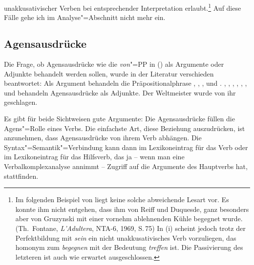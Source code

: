 unakkusativischer Verben bei entsprechender Interpretation erlaubt.\footnote{
        Im folgenden Beispiel von \citet[]{Faucher87}
        liegt keine solche abweichende Lesart vor.
        \ea
        Es konnte ihm nicht entgehen, dass ihm von Reiff und Duquesde,
        ganz besonders aber von Gruzynski mit einer vornehm
        ablehnenden Kühle begegnet wurde. (Th.\ Fontane, \emph{L'Adultera},
        NTA-6, 1969, S.\,75)
        \z
        In (i) scheint jedoch trotz der Perfektbildung mit \emph{sein}
        ein nicht unakkusativisches Verb vorzuliegen, das homonym zum \emph{begegnen}
        mit der Bedeutung \emph{treffen} ist. Die Passivierung des letzteren
        ist auch wie erwartet ausgeschlossen.
        \eal
        \zllast
}
Auf diese Fälle gehe ich im Analyse"=Abschnitt nicht mehr ein. 


\subsection{Agensausdrücke}

Die Frage, ob Agensausdrücke wie die \emph{von}"=PP in () als Argumente
oder Adjunkte behandelt werden sollen, wurde in der Literatur verschieden beantwortet: Als Argument behandeln 
die Präpositionalphrase \zb \citet[]{Heringer73a}, 
\citet{Bresnan82a}, \citet[215]{ps}, \citet{MS98a} und \citet[Abschnitt~15.3]{Mueller99a}.
%
\citet[]{Hoehle78a}, \citet{Sadzinski87a}, \citet[]{Stechow90a}, 
\citet[]{Zifonun92a}, 
\citet[]{Lieb92a},
\citet[]{Wunderlich93a}, 
\citet[Abschnitt~5]{Mueller2003e} und 
\citet[]{Gunkel2003b} 
behandeln Agensausdrücke als Adjunkte.
\ea
Der Weltmeister wurde von ihr geschlagen.
\z

\noindent
Es gibt für beide Sichtweisen gute Argumente: Die Agensausdrücke füllen die Agens"=Rolle
eines Verbs. Die einfachste Art, diese Beziehung auszudrücken, ist anzunehmen, dass Agensausdrücke
von ihrem Verb abhängen. Die Syntax"=Semantik"=Verbindung kann dann im Lexikoneintrag für das
Verb oder im Lexikoneintrag für das Hilfsverb, das ja -- wenn man eine Verbalkomplexanalyse annimmt --
Zugriff auf die Argumente des Hauptverbs hat, stattfinden.

